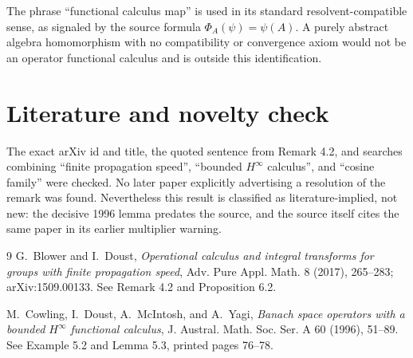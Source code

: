 \documentclass[11pt]{article}
\begin{document}
The phrase ``functional calculus map'' is used in its standard
resolvent-compatible sense, as signaled by the source formula
\(\Phi_A(\psi)=\psi(A)\).  A purely abstract algebra homomorphism with no
compatibility or convergence axiom would not be an operator functional
calculus and is outside this identification.

\section*{Literature and novelty check}
The exact arXiv id and title, the quoted sentence from Remark 4.2, and searches
combining ``finite propagation speed'', ``bounded \(H^\infty\) calculus'', and
``cosine family'' were checked.  No later paper explicitly advertising a
resolution of the remark was found.  Nevertheless this result is classified
as literature-implied, not new: the decisive 1996 lemma predates the source,
and the source itself cites the same paper in its earlier multiplier warning.

\begin{thebibliography}{9}
G.~Blower and I.~Doust,
\emph{Operational calculus and integral transforms for groups with finite
propagation speed}, Adv. Pure Appl. Math. 8 (2017), 265--283;
arXiv:1509.00133.  See Remark 4.2 and Proposition 6.2.

M.~Cowling, I.~Doust, A.~McIntosh, and A.~Yagi,
\emph{Banach space operators with a bounded \(H^\infty\) functional
calculus}, J. Austral. Math. Soc. Ser. A 60 (1996), 51--89.
See Example 5.2 and Lemma 5.3, printed pages 76--78.
\end{thebibliography}
\end{document}
